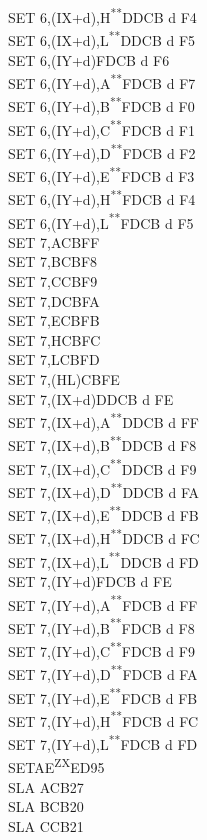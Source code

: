 \documentclass[12pt,twoside,openright,a4paper]{book}
\newcommand{\UNDOC}{\textnormal{\textsuperscript{**}}}
\newcommand{\ZXN}{\textnormal{\textsuperscript{ZX}}}
\begin{document}
\begin{multicols}{3}
{\begin{tabbing}
		SET 6,(IX+d),H\UNDOC\>DDCB d F4\\
		SET 6,(IX+d),L\UNDOC\>DDCB d F5\\
		SET 6,(IY+d)\>FDCB d F6\\
		SET 6,(IY+d),A\UNDOC\>FDCB d F7\\
		SET 6,(IY+d),B\UNDOC\>FDCB d F0\\
		SET 6,(IY+d),C\UNDOC\>FDCB d F1\\
		SET 6,(IY+d),D\UNDOC\>FDCB d F2\\
		SET 6,(IY+d),E\UNDOC\>FDCB d F3\\
		SET 6,(IY+d),H\UNDOC\>FDCB d F4\\
		SET 6,(IY+d),L\UNDOC\>FDCB d F5\\
		SET 7,A\>CBFF\\
		SET 7,B\>CBF8\\
		SET 7,C\>CBF9\\
		SET 7,D\>CBFA\\
		SET 7,E\>CBFB\\
		SET 7,H\>CBFC\\
		SET 7,L\>CBFD\\
		SET 7,(HL)\>CBFE\\
		SET 7,(IX+d)\>DDCB d FE\\
		SET 7,(IX+d),A\UNDOC\>DDCB d FF\\
		SET 7,(IX+d),B\UNDOC\>DDCB d F8\\
		SET 7,(IX+d),C\UNDOC\>DDCB d F9\\
		SET 7,(IX+d),D\UNDOC\>DDCB d FA\\
		SET 7,(IX+d),E\UNDOC\>DDCB d FB\\
		SET 7,(IX+d),H\UNDOC\>DDCB d FC\\
		SET 7,(IX+d),L\UNDOC\>DDCB d FD\\
		SET 7,(IY+d)\>FDCB d FE\\
		SET 7,(IY+d),A\UNDOC\>FDCB d FF\\
		SET 7,(IY+d),B\UNDOC\>FDCB d F8\\
		SET 7,(IY+d),C\UNDOC\>FDCB d F9\\
		SET 7,(IY+d),D\UNDOC\>FDCB d FA\\
		SET 7,(IY+d),E\UNDOC\>FDCB d FB\\
		SET 7,(IY+d),H\UNDOC\>FDCB d FC\\
		SET 7,(IY+d),L\UNDOC\>FDCB d FD\\
		SETAE\ZXN\>ED95\\
		SLA A\>CB27\\
		SLA B\>CB20\\
		SLA C\>CB21\\

\end{tabbing}}
\end{multicols}
\end{document}
